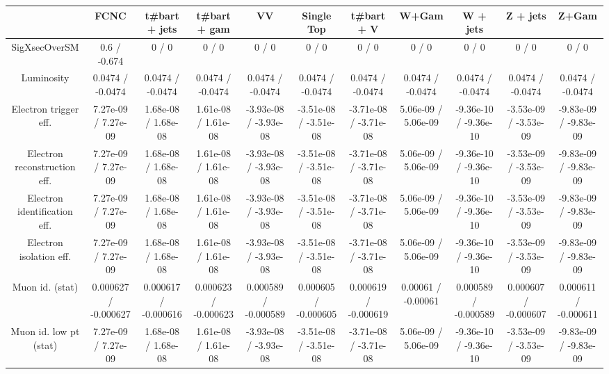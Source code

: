 \begin{table}[htbp]
\begin{center}
\footnotesize
\begin{tabular}{|c|c|c|c|c|c|c|c|c|c|c|}
\hline 
      & FCNC      & t#bar{t} + jets      & t#bar{t} +  gam      & VV      & Single Top      & t#bar{t} + V      & W+Gam      & W + jets      & Z + jets      & Z+Gam \\ 
\hline 
 SigXsecOverSM & 0.6 / -0.674 & 0 / 0 & 0 / 0 & 0 / 0 & 0 / 0 & 0 / 0 & 0 / 0 & 0 / 0 & 0 / 0 & 0 / 0 \\ 
  Luminosity & 0.0474 / -0.0474 & 0.0474 / -0.0474 & 0.0474 / -0.0474 & 0.0474 / -0.0474 & 0.0474 / -0.0474 & 0.0474 / -0.0474 & 0.0474 / -0.0474 & 0.0474 / -0.0474 & 0.0474 / -0.0474 & 0.0474 / -0.0474 \\ 
  Electron trigger eff. & 7.27e-09 / 7.27e-09 & 1.68e-08 / 1.68e-08 & 1.61e-08 / 1.61e-08 & -3.93e-08 / -3.93e-08 & -3.51e-08 / -3.51e-08 & -3.71e-08 / -3.71e-08 & 5.06e-09 / 5.06e-09 & -9.36e-10 / -9.36e-10 & -3.53e-09 / -3.53e-09 & -9.83e-09 / -9.83e-09 \\ 
  Electron reconstruction eff. & 7.27e-09 / 7.27e-09 & 1.68e-08 / 1.68e-08 & 1.61e-08 / 1.61e-08 & -3.93e-08 / -3.93e-08 & -3.51e-08 / -3.51e-08 & -3.71e-08 / -3.71e-08 & 5.06e-09 / 5.06e-09 & -9.36e-10 / -9.36e-10 & -3.53e-09 / -3.53e-09 & -9.83e-09 / -9.83e-09 \\ 
  Electron identification eff. & 7.27e-09 / 7.27e-09 & 1.68e-08 / 1.68e-08 & 1.61e-08 / 1.61e-08 & -3.93e-08 / -3.93e-08 & -3.51e-08 / -3.51e-08 & -3.71e-08 / -3.71e-08 & 5.06e-09 / 5.06e-09 & -9.36e-10 / -9.36e-10 & -3.53e-09 / -3.53e-09 & -9.83e-09 / -9.83e-09 \\ 
  Electron isolation eff. & 7.27e-09 / 7.27e-09 & 1.68e-08 / 1.68e-08 & 1.61e-08 / 1.61e-08 & -3.93e-08 / -3.93e-08 & -3.51e-08 / -3.51e-08 & -3.71e-08 / -3.71e-08 & 5.06e-09 / 5.06e-09 & -9.36e-10 / -9.36e-10 & -3.53e-09 / -3.53e-09 & -9.83e-09 / -9.83e-09 \\ 
  Muon id. (stat) & 0.000627 / -0.000627 & 0.000617 / -0.000616 & 0.000623 / -0.000623 & 0.000589 / -0.000589 & 0.000605 / -0.000605 & 0.000619 / -0.000619 & 0.00061 / -0.00061 & 0.000589 / -0.000589 & 0.000607 / -0.000607 & 0.000611 / -0.000611 \\ 
  Muon id. low pt (stat) & 7.27e-09 / 7.27e-09 & 1.68e-08 / 1.68e-08 & 1.61e-08 / 1.61e-08 & -3.93e-08 / -3.93e-08 & -3.51e-08 / -3.51e-08 & -3.71e-08 / -3.71e-08 & 5.06e-09 / 5.06e-09 & -9.36e-10 / -9.36e-10 & -3.53e-09 / -3.53e-09 & -9.83e-09 / -9.83e-09 \\ 

\end{tabular}
\end{center}
\end{table}
